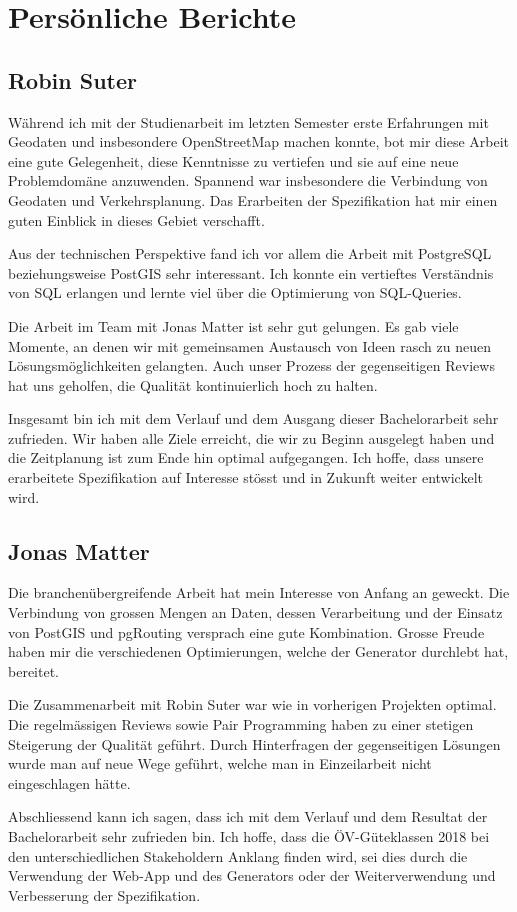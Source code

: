 
\section{Persönliche Berichte}
\label{sub:Persönliche Berichte}

\subsection{Robin Suter}
\label{Persönliche Berichte:Robin Suter}

Während ich mit der Studienarbeit im letzten Semester erste Erfahrungen mit Geodaten und insbesondere \gls{OpenStreetMap} machen konnte, bot mir diese Arbeit eine gute Gelegenheit, diese Kenntnisse zu vertiefen und sie auf eine neue Problemdomäne anzuwenden.
Spannend war insbesondere die Verbindung von Geodaten und Verkehrsplanung.
Das Erarbeiten der Spezifikation hat mir einen guten Einblick in dieses Gebiet verschafft.

Aus der technischen Perspektive fand ich vor allem die Arbeit mit PostgreSQL beziehungsweise PostGIS sehr interessant.
Ich konnte ein vertieftes Verständnis von SQL erlangen und lernte viel über die Optimierung von SQL-Queries.

Die Arbeit im Team mit Jonas Matter ist sehr gut gelungen.
Es gab viele Momente, an denen wir mit gemeinsamen Austausch von Ideen rasch zu neuen Lösungsmöglichkeiten gelangten.
Auch unser Prozess der gegenseitigen Reviews hat uns geholfen, die Qualität kontinuierlich hoch zu halten.

Insgesamt bin ich mit dem Verlauf und dem Ausgang dieser Bachelorarbeit sehr zufrieden.
Wir haben alle Ziele erreicht, die wir zu Beginn ausgelegt haben und die Zeitplanung ist zum Ende hin optimal aufgegangen.
Ich hoffe, dass unsere erarbeitete Spezifikation auf Interesse stösst und in Zukunft weiter entwickelt wird.

\subsection{Jonas Matter}
\label{Persönliche Berichte:Jonas Matter}

Die branchenübergreifende Arbeit hat mein Interesse von Anfang an geweckt.
Die Verbindung von grossen Mengen an Daten, dessen Verarbeitung und der Einsatz von PostGIS und pgRouting versprach eine gute Kombination.
Grosse Freude haben mir die verschiedenen Optimierungen, welche der Generator durchlebt hat, bereitet.

Die Zusammenarbeit mit Robin Suter war wie in vorherigen Projekten optimal.
Die regelmässigen Reviews sowie Pair Programming haben zu einer stetigen Steigerung der Qualität geführt.
Durch Hinterfragen der gegenseitigen Lösungen wurde man auf neue Wege geführt, welche man in Einzeilarbeit nicht eingeschlagen hätte.

Abschliessend kann ich sagen, dass ich mit dem Verlauf und dem Resultat der Bachelorarbeit sehr zufrieden bin.
Ich hoffe, dass die ÖV-Güteklassen 2018 bei den unterschiedlichen Stakeholdern Anklang finden wird, sei dies durch die Verwendung der Web-App und des Generators oder der Weiterverwendung und Verbesserung der Spezifikation.
